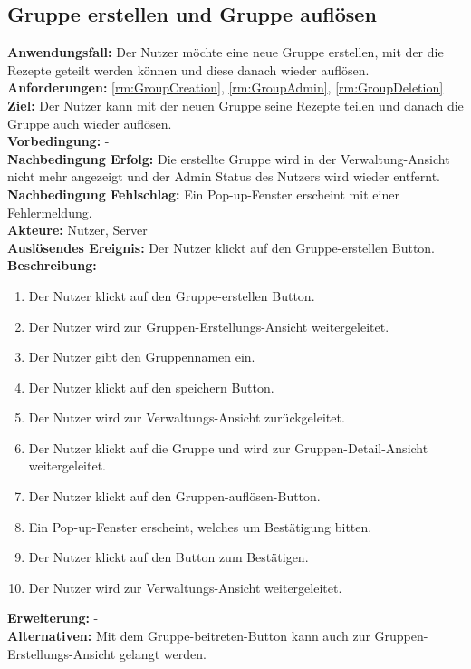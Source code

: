 \documentclass[parskip=full]{scrartcl}
\begin{document}
\subsection{Gruppe erstellen und Gruppe auflösen}
\textbf{Anwendungsfall:} Der Nutzer möchte eine neue Gruppe erstellen, mit der die Rezepte geteilt werden können und diese danach wieder auflösen.\\
\textbf{Anforderungen:} \ref{rm:GroupCreation}, \ref{rm:GroupAdmin}, \ref{rm:GroupDeletion} \\
\textbf{Ziel:} Der Nutzer kann mit der neuen Gruppe seine Rezepte teilen und danach die Gruppe auch wieder auflösen.\\
\textbf{Vorbedingung:} -\\
\textbf{Nachbedingung Erfolg:} Die erstellte Gruppe wird in der Verwaltung-Ansicht nicht mehr angezeigt und der Admin Status des Nutzers wird wieder entfernt.\\
\textbf{Nachbedingung Fehlschlag:} Ein Pop-up-Fenster erscheint mit einer Fehlermeldung.\\
\textbf{Akteure:} Nutzer, Server\\
\textbf{Auslösendes Ereignis:} Der Nutzer klickt auf den Gruppe-erstellen Button.\\
\textbf{Beschreibung:}
\begin{enumerate}
    \item Der Nutzer klickt auf den Gruppe-erstellen Button.
    \item Der Nutzer wird zur Gruppen-Erstellungs-Ansicht weitergeleitet.
    \item Der Nutzer gibt den Gruppennamen ein.
    \item Der Nutzer klickt auf den speichern Button.
    \item Der Nutzer wird zur Verwaltungs-Ansicht zurückgeleitet.
    \item Der Nutzer klickt auf die Gruppe und wird zur Gruppen-Detail-Ansicht weitergeleitet.
    \item Der Nutzer klickt auf den Gruppen-auflösen-Button.
    \item Ein Pop-up-Fenster erscheint, welches um Bestätigung bitten.
    \item Der Nutzer klickt auf den Button zum Bestätigen.
    \item Der Nutzer wird zur Verwaltungs-Ansicht weitergeleitet.
\end{enumerate}
\textbf{Erweiterung:} -\\
\textbf{Alternativen:} Mit dem Gruppe-beitreten-Button kann auch zur Gruppen-Erstellungs-Ansicht gelangt werden.
\newpage
\end{document}
